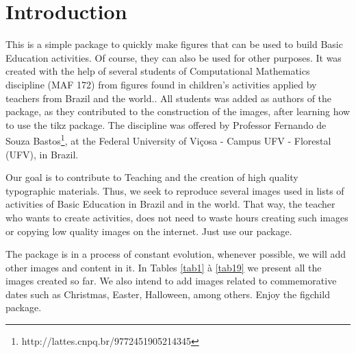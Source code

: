 \documentclass{article}
\begin{document}
\tableofcontents

\listoftables

\section{Introduction}

\hspace{\parindent}This is a simple package to quickly make figures that can be used to build Basic Education activities. Of course, they can also be used for other purposes. It was created with the help of several students of Computational Mathematics discipline (MAF 172) from figures found in children's activities applied by teachers from Brazil and the world.. All students was added as authors of the package, as they contributed to the construction of the images, after learning how to use the tikz package. The discipline was offered by Professor Fernando de Souza Bastos\footnote{http://lattes.cnpq.br/9772451905214345}, at the Federal University of Viçosa - Campus UFV - Florestal (UFV), in Brazil.

Our goal is to contribute to Teaching and the creation of high quality typographic materials. Thus, we seek to reproduce several images used in lists of activities of Basic Education in Brazil and in the world. That way, the teacher who wants to create activities, does not need to waste hours creating such images or copying low quality images on the internet. Just use our package.

The package is in a process of constant evolution, whenever possible, we will add other images and content in it. In Tables \ref{tab1} à \ref{tab19} we present all the images created so far. We also intend to add images related to commemorative dates such as Christmas, Easter, Halloween, among others. Enjoy the figchild package.





\end{document}

